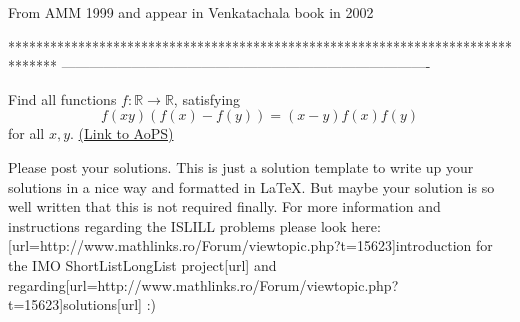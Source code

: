 \begin{solution}
	From AMM 1999
and appear in Venkatachala book in 2002 
\end{solution}
*******************************************************************************
-------------------------------------------------------------------------------

\begin{problem}
	Find all functions $f: \mathbb{R} \rightarrow \mathbb{R}$, satisfying \[
f(xy)(f(x) - f(y)) = (x-y)f(x)f(y)
\] for all $x,y$.
	\flushright \href{https://artofproblemsolving.com/community/c6h17450}{(Link to AoPS)}
\end{problem}



\begin{solution}
	Please post your solutions. This is just a solution template to write up your solutions in a nice way and formatted in LaTeX. But maybe your solution is so well written that this is not required finally. For more information and instructions regarding the ISL\/ILL problems please look here: [url=http://www.mathlinks.ro/Forum/viewtopic.php?t=15623]introduction for the IMO ShortList\/LongList project[\/url] and regarding[url=http://www.mathlinks.ro/Forum/viewtopic.php?t=15623]solutions[\/url]  :)
\end{solution}



